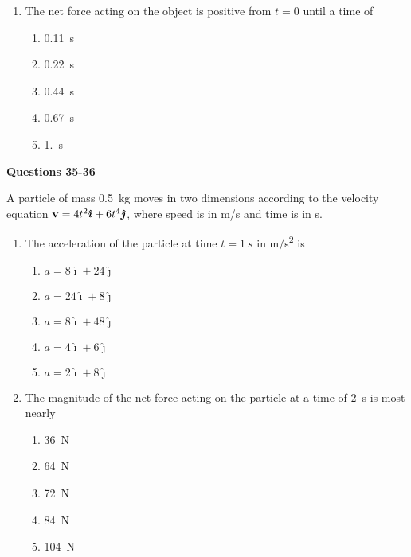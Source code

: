 \documentclass{../../oss-apphys}
\begin{document}
\begin{multicols}{2}
\begin{enumerate}[resume,leftmargin=18pt]
  \item The net force acting on the object is positive from $t=0$ until a time
    of
    \begin{enumerate}[noitemsep,topsep=0pt,leftmargin=18pt,label=(\Alph*)]
    \item\SI{.11}{\second}
    \item\SI{.22}{\second}
    \item\SI{.44}{\second}
    \item\SI{.67}{\second}
    \item\SI{1.}{\second}
    \end{enumerate}
  \end{enumerate}
  
  \textbf{Questions 35-36}
  
  A particle of mass \SI{.5}{\kilo\gram} moves in two dimensions
  according to the velocity equation
  $\mathbf{v}=4t^2\bm{\hat{\imath}} + 6t^4 \bm{\hat{\jmath}}$, where speed is in
  \si{m/s} and time is in \si{\second}.

  \begin{enumerate}[resume,leftmargin=18pt]
  \item The acceleration of the particle at time $t=\SI{1}{s}$ in \si{m/s^2} is
    \begin{enumerate}[noitemsep,topsep=0pt,leftmargin=18pt,label=(\Alph*)]
    \item $a=8\bm{\hat{\imath}} + 24\bm{\hat{\jmath}}$
    \item $a=24\bm{\hat{\imath}} + 8\bm{\hat{\jmath}}$
    \item $a=8\bm{\hat{\imath}} + 48\bm{\hat{\jmath}}$
    \item $a=4\bm{\hat{\imath}} + 6\bm{\hat{\jmath}}$
    \item $a=2\bm{\hat{\imath}} + 8\bm{\hat{\jmath}}$
    \end{enumerate}

  \item The magnitude of the net force acting on the particle at a time of
    \SI{2}{s} is most nearly
    \begin{enumerate}[noitemsep,topsep=0pt,leftmargin=18pt,label=(\Alph*)]
    \item\SI{36}{\newton}
    \item\SI{64}{\newton}
    \item\SI{72}{\newton}
    \item\SI{84}{\newton}
    \item\SI{104}{\newton}
    \end{enumerate}
    \columnbreak
    

\end{enumerate}
\end{multicols}
\end{document}
